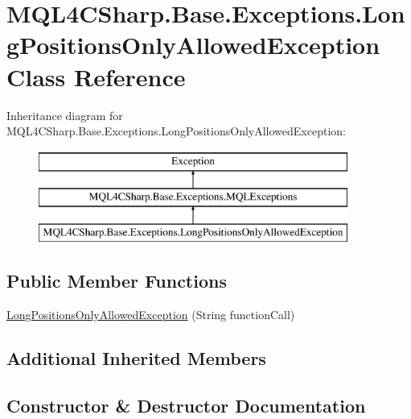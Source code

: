 \hypertarget{class_m_q_l4_c_sharp_1_1_base_1_1_exceptions_1_1_long_positions_only_allowed_exception}{}\section{M\+Q\+L4\+C\+Sharp.\+Base.\+Exceptions.\+Long\+Positions\+Only\+Allowed\+Exception Class Reference}
\label{class_m_q_l4_c_sharp_1_1_base_1_1_exceptions_1_1_long_positions_only_allowed_exception}
Inheritance diagram for M\+Q\+L4\+C\+Sharp.\+Base.\+Exceptions.\+Long\+Positions\+Only\+Allowed\+Exception\+:\begin{figure}[H]
\begin{center}
\leavevmode
\includegraphics[height=3.000000cm]{class_m_q_l4_c_sharp_1_1_base_1_1_exceptions_1_1_long_positions_only_allowed_exception}
\end{center}
\end{figure}
\subsection*{Public Member Functions}
\begin{DoxyCompactItemize}
\item 
\hyperlink{class_m_q_l4_c_sharp_1_1_base_1_1_exceptions_1_1_long_positions_only_allowed_exception_a5147ccd40e57a3d4a2835a22201ea1e7}{Long\+Positions\+Only\+Allowed\+Exception} (String function\+Call)
\end{DoxyCompactItemize}
\subsection*{Additional Inherited Members}


\subsection{Constructor \& Destructor Documentation}
